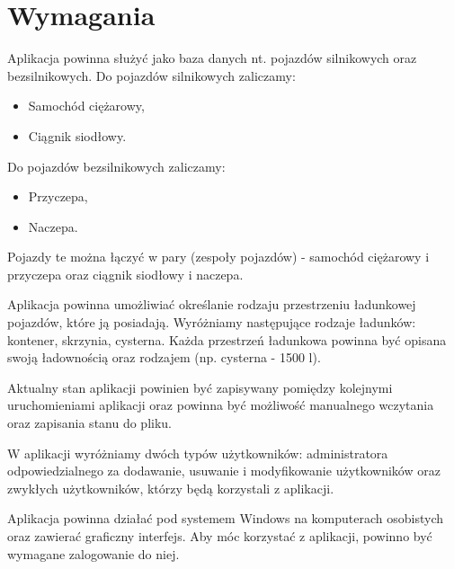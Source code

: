 \chapter{Wymagania}

Aplikacja powinna służyć jako baza danych nt. pojazdów silnikowych oraz bezsilnikowych.
Do pojazdów silnikowych zaliczamy:
\begin{itemize}
    \item Samochód ciężarowy,
    \item Ciągnik siodłowy.
\end{itemize}
Do pojazdów bezsilnikowych zaliczamy:
\begin{itemize}
    \item Przyczepa,
    \item Naczepa.
\end{itemize}
Pojazdy te można łączyć w pary (zespoły pojazdów) - samochód ciężarowy i przyczepa oraz ciągnik siodłowy i naczepa.

Aplikacja powinna umożliwiać określanie rodzaju przestrzeniu ładunkowej pojazdów, które ją posiadają. Wyróżniamy
następujące rodzaje ładunków: kontener, skrzynia, cysterna. Każda przestrzeń ładunkowa powinna być opisana swoją
ładownością oraz rodzajem (np. cysterna - 1500 \si{\litre}).

Aktualny stan aplikacji powinien być zapisywany pomiędzy kolejnymi uruchomieniami aplikacji oraz
powinna być możliwość manualnego wczytania oraz zapisania stanu do pliku.

W aplikacji wyróżniamy dwóch typów użytkowników: administratora odpowiedzialnego za dodawanie, usuwanie i
modyfikowanie użytkowników oraz zwykłych użytkowników, którzy będą korzystali z aplikacji.

Aplikacja powinna działać pod systemem Windows na komputerach osobistych oraz zawierać graficzny interfejs.
Aby móc korzystać z aplikacji, powinno być wymagane zalogowanie do niej.

